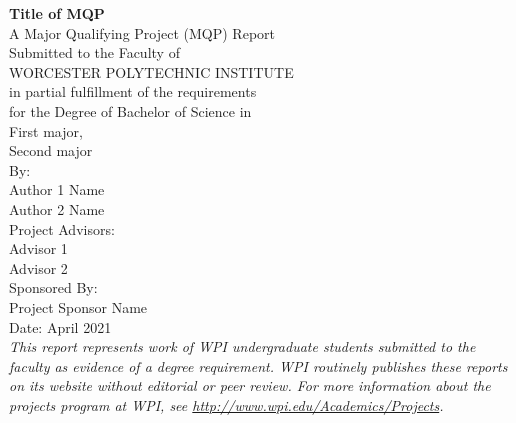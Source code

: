 \documentclass{article}
\begin{document}
 



\begin{center}
    \Huge{\textbf{Title of MQP}} \\ %
    \vspace{10mm} %
    \large{
    A Major Qualifying Project (MQP) Report \\
    Submitted to the Faculty of \\
    WORCESTER POLYTECHNIC INSTITUTE \\
    in partial fulfillment of the requirements \\
    for the Degree of Bachelor of Science in \\
    } %
    \Large{
    \vspace{5mm} %
    First major, \\ %
    Second major \\ %
    \vspace{10mm} %
    By: \\
    \vspace{5mm} %
    Author 1 Name \\ %
    Author 2 Name \\ %
    \vspace {15mm} %
    Project Advisors: \\ %
    \vspace{5mm} %
    Advisor 1 \\ %
    Advisor 2 \\  %
    \vspace {15mm} %
    Sponsored By: \\ 
    \vspace{5mm} %
    Project Sponsor Name \\ %
    \vspace {10mm} %
    Date: April 2021 \\ %
    }
    \vspace{10mm} %
    \large{\textit{This report represents work of WPI undergraduate students submitted to the faculty as evidence of a degree requirement. WPI routinely publishes these reports on its website without editorial or peer review. For more information about the projects program at WPI, see \url{http://www.wpi.edu/Academics/Projects}.}} %
\end{center}
\end{document}
